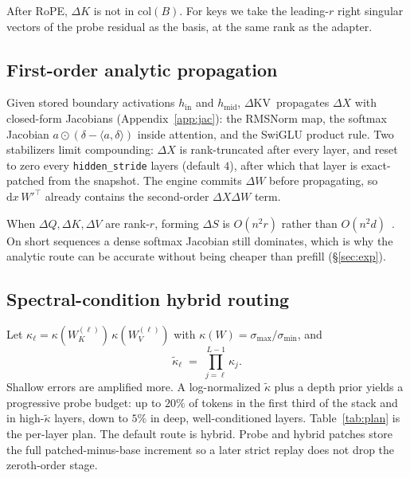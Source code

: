 \documentclass{article}
\newcommand{\dkv}{$\Delta$KV}
\begin{document}
After RoPE, $\Delta K$ is not in $\mathrm{col}(B)$.
For keys we take the leading-$r$ right singular vectors of the probe
residual as the basis, at the same rank as the adapter.

\subsection{First-order analytic propagation}
\label{sec:analytic}

Given stored boundary activations $h_{\mathrm{in}}$ and $h_{\mathrm{mid}}$,
\dkv\ propagates $\Delta X$ with closed-form Jacobians
(Appendix~\ref{app:jac}):
the RMSNorm map, the softmax Jacobian
$a\odot(\delta-\langle a,\delta\rangle)$ inside attention, and the
SwiGLU product rule.
Two stabilizers limit compounding:
$\Delta X$ is rank-truncated after every layer, and reset to zero every
\texttt{hidden\_stride} layers (default $4$), after which that layer is
exact-patched from the snapshot.
The engine commits $\Delta W$ before propagating, so
$\mathrm{d}x\,{W'}^\top$ already contains the second-order
$\Delta X\Delta W$ term.

When $\Delta Q,\Delta K,\Delta V$ are rank-$r$, forming $\Delta S$ is
$O(n^2 r)$ rather than $O(n^2 d)$~\citep{dao2022flashattention}.
On short sequences a dense softmax Jacobian still dominates, which is
why the analytic route can be accurate without being cheaper than
prefill (\S\ref{sec:exp}).

\subsection{Spectral-condition hybrid routing}
\label{sec:hybrid}

Let $\kappa_\ell=\kappa(W_K^{(\ell)})\,\kappa(W_V^{(\ell)})$ with
$\kappa(W)=\sigma_{\max}/\sigma_{\min}$, and
\begin{equation}
  \tilde\kappa_\ell \;=\; \prod_{j=\ell}^{L-1} \kappa_j.
\end{equation}
Shallow errors are amplified more.
A log-normalized $\tilde\kappa$ plus a depth prior yields a progressive
probe budget: up to $20\%$ of tokens in the first third of the stack and
in high-$\tilde\kappa$ layers, down to $5\%$ in deep, well-conditioned
layers.
Table~\ref{tab:plan} is the per-layer plan.
The default route is hybrid.
Probe and hybrid patches store the full patched-minus-base increment so
a later strict replay does not drop the zeroth-order stage.
\end{document}
